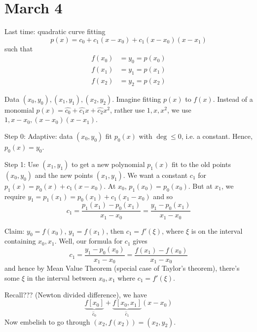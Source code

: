 \documentclass{article}
\theoremstyle{plain}
\theoremstyle{remark}
\begin{document}
\section{March 4}
Last time: quadratic curve fitting
\[
	p(x) = c_0 + c_1(x-x_0) + c_1(x-x_0)(x-x_1)
\]
such that
\begin{align*}
	f(x_0) &= y_0 = p(x_0)\\
	f(x_1) &= y_1 = p(x_1)\\
	f(x_2) &= y_2 = p(x_2)
\end{align*}

Data $(x_0,y_0),(x_1,y_1),(x_2,y_2)$.
Imagine fitting $p(x)$ to $f(x)$.
Instead of a monomial $p(x) = \hat{c_0} + \hat{c_1}x + \hat{c_2}x^2$,
rather use $1,x,x^2$, we use $1,x-x_0,(x-x_0)(x-x_1)$.

Step 0: Adaptive: data $(x_0,y_0)$ fit $p_0(x)$ with $\deg\leq 0$,
i.e. a constant.
Hence, $p_0(x) = y_0$.

Step 1: Use $(x_1,y_1)$ to get a new polynomial $p_1(x)$
fit to the old points $(x_0,y_0)$ and the new points $(x_1,y_1)$.
We want a constant $c_1$ for $p_1(x) = p_0(x) + c_1(x-x_0)$.
At $x_0$, $p_1(x_0) = p_0(x_0)$.
But at $x_1$, we require $y_1 = p_1(x_1) = p_0(x_1) + c_1(x_1 - x_0)$
and so
\[
	c_1 = \frac{p_1(x_1) - p_0(x_1)}{x_1 - x_0} = \frac{y_1 - p_0(x_1)}{x_1-x_0}
\]

Claim: $y_0 = f(x_0)$, $y_1 = f(x_1)$,
then $c_1 = f'(\xi)$, where $\xi$ is on the interval containing $x_0,x_1$.
Well, our formula for $c_1$ gives
\[
	c_1 = \frac{y_1 - p_0(x_0)}{x_1-x_0} = \frac{f(x_1) - f(x_0)}{x_1-x_0}
\]
and hence by Mean Value Theorem (special case of Taylor's theorem),
there's some $\xi$ in the interval between $x_0,x_1$ where $c_1 = f'(\xi)$.

Recall??? (Newton divided difference), we have
\[
	\underbrace{f[x_0]}_{\hat{c}_0} + \underbrace{f[x_0,x_1]}_{\hat{c}_1}(x-x_0)
\]
Now embelish to go through $(x_2,f(x_2)) = (x_2,y_2)$.
\end{document}

